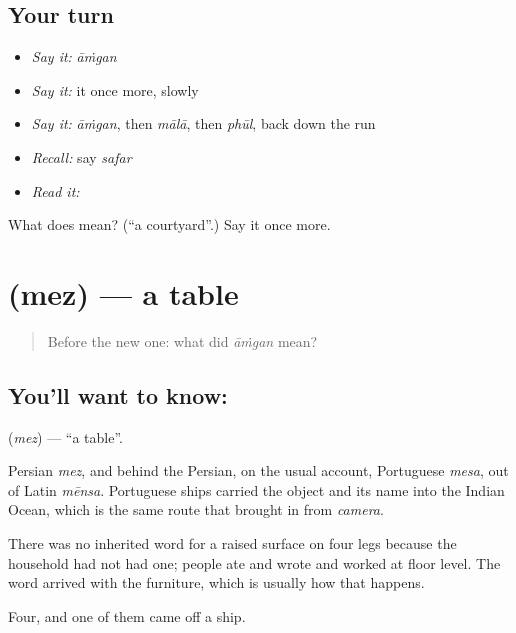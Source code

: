 \subsection*{Your turn}
\begin{itemize}
\raggedright
  \item \emph{Say it:} \emph{āṁgan}
  \item \emph{Say it:} it once more, slowly
  \item \emph{Say it:} \emph{āṁgan}, then \emph{mālā}, then \emph{phūl}, back down the run
  \item \emph{Recall:} say \emph{safar}
  \item \emph{Read it:} \textbf{}
\end{itemize}

\begin{tcolorbox}[breakable,colback=teal!4,colframe=teal!35!black,title={Before you move on}]
What does  mean? (\textquotedblleft{}a courtyard\textquotedblright{}.) Say it once more.
\end{tcolorbox}
\section[\texorpdfstring{\hi{मेज़} (mez)}{मेज़ (mez)}]{ (mez) — a table}

\label{lesson:HI-C51-table}



\begin{quote}
Before the new one: what did \emph{āṁgan} mean?
\end{quote}

\subsection*{You'll want to know: }
\textbf{} (\emph{mez}) — \textquotedblleft{}a table\textquotedblright{}.

Persian \emph{mez}, and behind the Persian, on the usual account, Portuguese \emph{mesa}, out of Latin \emph{mēnsa}. Portuguese ships carried the object and its name into the Indian Ocean, which is the same route that brought  in from \emph{camera}.

There was no inherited word for a raised surface on four legs because the household had not had one; people ate and wrote and worked at floor level. The word arrived with the furniture, which is usually how that happens.

\begin{grammarlens}[title={What you've built}]
Four, and one of them came off a ship.
\end{grammarlens}

